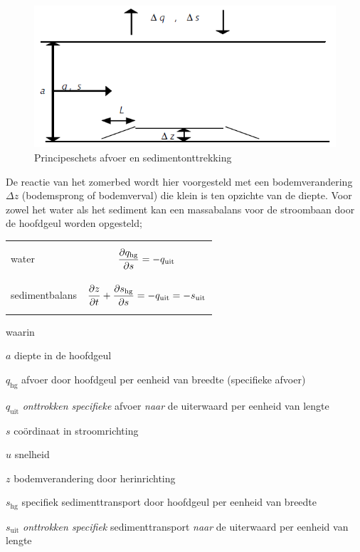 \begin{figure}
\includegraphics[width=\columnwidth]{figures/Fig4.png}
\caption{Principeschets afvoer en sedimentonttrekking}
\label{Fig4}
\end{figure}

De reactie van het zomerbed wordt hier voorgesteld met een bodemverandering $\Delta z$  (bodemsprong of bodemverval) die klein is ten opzichte van de diepte.
Voor zowel het water als het sediment kan een massabalans voor de stroombaan door de hoofdgeul worden opgesteld;

\begin{tabular}{p{3cm}p{\textwidth-3cm}}
water & \parbox{\textwidth-4cm}{\begin{equation}
\pdiff{q_\text{hg}}{s} = -q_\text{uit}
\end{equation}} \label{Eq2} \\
sedimentbalans & \parbox{\textwidth-4cm}{\begin{equation}
\pdiff{z}{t} + \pdiff{s_\text{hg}}{s}= -q_\text{uit} = -s_\text{uit}
\end{equation}} \label{Eq3} \\
\end{tabular}

waarin

\begin{symbollist}
\item[$a$]  diepte in de hoofdgeul
\item[$q_\text{hg}$]  afvoer door hoofdgeul per eenheid van breedte (specifieke afvoer)
\item[$q_\text{uit}$]  \emph{onttrokken specifieke} afvoer \emph{naar} de uiterwaard per eenheid van
lengte
\item[$s$]  co\"ordinaat in stroomrichting
\item[$u$]  snelheid
\item[$z$]  bodemverandering door herinrichting
\item[$s_\text{hg}$]  specifiek sedimenttransport door hoofdgeul per eenheid van breedte
\item[$s_\text{uit}$]  \emph{onttrokken specifiek} sedimenttransport \emph{naar} de uiterwaard per eenheid van lengte
\end{symbollist}

